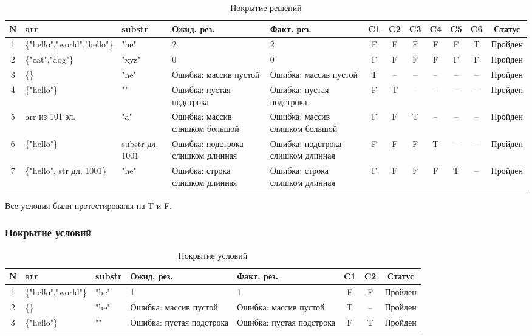 \documentclass{article}[14pt]
\begin{document}
\begin{table}[h!]
\centering
\caption{Покрытие решений}
\begin{tabularx}{\textwidth}{|c|X|X|X|X|c|c|c|c|c|c|c|}
\hline
\textbf{N} & \textbf{arr} & \textbf{substr} & \textbf{Ожид. рез.} & \textbf{Факт. рез.} & \textbf{C1} & \textbf{C2} & \textbf{C3} & \textbf{C4} & \textbf{C5} & \textbf{C6} & \textbf{Статус} \\
\hline
1 & \{"hello","world","hello"\} & "he" & 2 & 2 & F & F & F & F & F & T & Пройден \\
\hline
2 & \{"cat","dog"\} & "xyz" & 0 & 0 & F & F & F & F & F & F & Пройден \\
\hline
3 & \{\} & "he" & Ошибка: массив пустой & Ошибка: массив пустой & T & -- & -- & -- & -- & -- & Пройден \\
\hline
4 & \{"hello"\} & "" & Ошибка: пустая подстрока & Ошибка: пустая подстрока & F & T & -- & -- & -- & -- & Пройден \\
\hline
5 & arr из 101 эл. & "a" & Ошибка: массив слишком большой & Ошибка: массив слишком большой & F & F & T & -- & -- & -- & Пройден \\
\hline
6 & \{"hello"\} & substr дл. 1001 & Ошибка: подстрока слишком длинная & Ошибка: подстрока слишком длинная & F & F & F & T & -- & -- & Пройден \\
\hline
7 & \{"hello", str дл. 1001\} & "he" & Ошибка: строка слишком длинная & Ошибка: строка слишком длинная & F & F & F & F & T & -- & Пройден \\
\hline
\end{tabularx}
\end{table}

Все условия были протестированы на T и F.

\subsubsection{Покрытие условий}

\begin{table}[h!]
\centering
\caption{Покрытие условий}
\begin{tabularx}{\textwidth}{|c|X|X|X|X|c|c|c|}
\hline
\textbf{N} & \textbf{arr} & \textbf{substr} & \textbf{Ожид. рез.} & \textbf{Факт. рез.} & \textbf{C1} & \textbf{C2} & \textbf{Статус} \\
\hline
1 & \{"hello","world"\} & "he" & 1 & 1 & F & F & Пройден \\
\hline
2 & \{\} & "he" & Ошибка: массив пустой & Ошибка: массив пустой & T & -- & Пройден \\
\hline
3 & \{"hello"\} & "" & Ошибка: пустая подстрока & Ошибка: пустая подстрока & F & T & Пройден \\
\hline
\end{tabularx}
\end{table}
\end{document}
